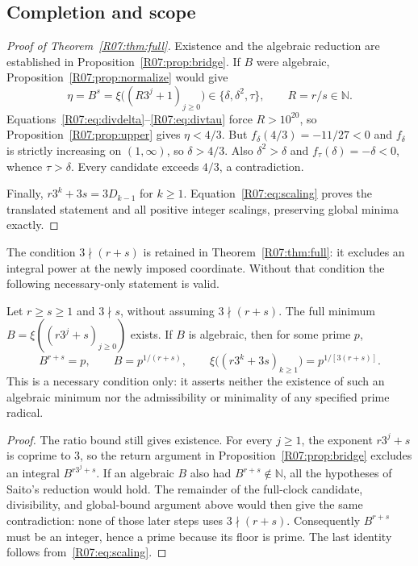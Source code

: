 \documentclass[11pt,a4paper]{article}
\theoremstyle{definition}\newtheorem{definition}[theorem]{Definition}
\theoremstyle{remark}\newtheorem{remark}[theorem]{Remark}
\newcommand{\N}{\mathbb N}\newcommand{\Z}{\mathbb Z}\newcommand{\Q}{\mathbb Q}
\begin{document}
\subsection{Completion and scope}

\begin{proof}[Proof of Theorem~\ref{R07:thm:full}]
Existence and the algebraic reduction are established in
Proposition~\ref{R07:prop:bridge}. If $B$ were algebraic,
Proposition~\ref{R07:prop:normalize} would give
\[
       \eta=B^s=\xi\bigl((R3^j+1)_{j\ge0}\bigr)
                  \in\{\delta,\delta^2,\tau\},\qquad R=r/s\in\N.
\]
Equations~\eqref{R07:eq:divdelta}--\eqref{R07:eq:divtau} force $R>10^{20}$,
so Proposition~\ref{R07:prop:upper} gives $\eta<4/3$.
But $f_\delta(4/3)=-11/27<0$ and $f_\delta$ is strictly increasing
on $(1,\infty)$, so $\delta>4/3$. Also $\delta^2>\delta$ and
$f_\tau(\delta)=-\delta<0$, whence $\tau>\delta$.
Every candidate exceeds $4/3$, a contradiction.

Finally, $r3^k+3s=3D_{k-1}$ for $k\ge1$.
Equation~\eqref{R07:eq:scaling} proves the translated statement and all
positive integer scalings, preserving global minima exactly.
\end{proof}

The condition $3\nmid(r+s)$ is retained in Theorem~\ref{R07:thm:full}:
it excludes an integral power at the newly imposed coordinate.
Without that condition the following necessary-only statement is valid.

\begin{proposition}
\label{R07:prop:boundary}
Let $r\ge s\ge1$ and $3\nmid s$, without assuming $3\nmid(r+s)$.
The full minimum $B=\xi((r3^j+s)_{j\ge0})$ exists.
If $B$ is algebraic, then for some prime $p$,
\[
 B^{r+s}=p,\qquad B=p^{1/(r+s)},\qquad
 \xi\bigl((r3^k+3s)_{k\ge1}\bigr)=p^{1/[3(r+s)]}.
\]
This is a necessary condition only: it asserts neither the existence of
such an algebraic minimum nor the admissibility or minimality of any
specified prime radical.
\end{proposition}
\begin{proof}
The ratio bound still gives existence. For every $j\ge1$, the exponent
$r3^j+s$ is coprime to $3$, so the return argument in
Proposition~\ref{R07:prop:bridge} excludes an integral $B^{r3^j+s}$.
If an algebraic $B$ also had $B^{r+s}\notin\N$, all the hypotheses of
Saito's reduction would hold. The remainder of the full-clock candidate,
divisibility, and global-bound argument above would then give the same
contradiction: none of those later steps uses $3\nmid(r+s)$.
Consequently $B^{r+s}$ must be an integer, hence a prime because its
floor is prime. The last identity follows from~\eqref{R07:eq:scaling}.
\end{proof}
\end{document}
